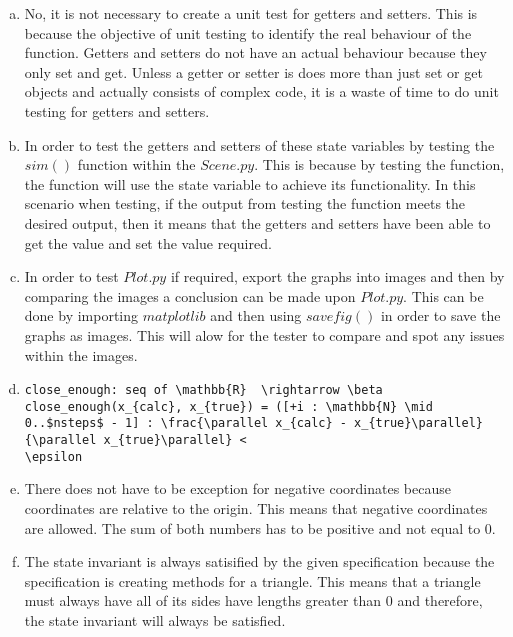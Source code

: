 \documentclass[12pt]{article}
\begin{document}
\begin{enumerate}[a)]

\item No, it is not necessary to create a unit test for getters and setters. This is because the objective of unit testing to identify the real behaviour
of the function. Getters and setters do not have an actual behaviour because they only set and get. Unless a getter or setter is does more than just set or
get objects and actually consists of complex code, it is a waste of time to do unit testing for getters and setters.

\item In order to test the getters and setters of these state variables by testing the $sim()$ function within the $Scene.py$. This is because by testing the
function, the function will use the state variable to achieve its functionality. In this scenario when testing, if the output from testing the function meets
the desired output, then it means that the getters and setters have been able to get the value and set the value required.

\item In order to test $Plot.py$ if required, export the graphs into images and then by comparing the images a conclusion can be made upon $Plot.py$. This
can be done by importing $matplotlib$ and then using $savefig()$ in order to save the graphs as images. This will alow for the tester to compare and spot
any issues within the images.

\item
\begin {lstlisting}
close_enough: seq of \mathbb{R}  \rightarrow \beta 
close_enough(x_{calc}, x_{true}) = ([+i : \mathbb{N} \mid 0..$nsteps$ - 1] : \frac{\parallel x_{calc} - x_{true}\parallel}{\parallel x_{true}\parallel} <
\epsilon 
\end{lstlisting}

\item There does not have to be exception for negative coordinates because coordinates are relative to the origin. This means that negative coordinates are
allowed. The sum of both numbers has to be positive and not equal to 0.

\item The state invariant is always satisified by the given specification because the specification is creating methods for a triangle. This means that a
triangle must always have all of its sides have lengths greater than 0 and therefore, the state invariant will always be satisfied.


\end{enumerate}
\end{document}
